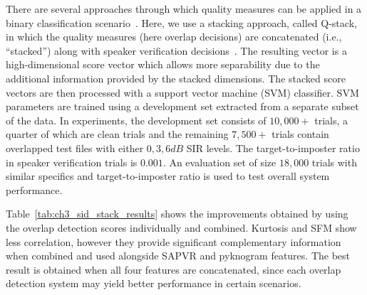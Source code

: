 There are several approaches through which quality measures can be applied in a binary classification scenario~\cite{bosaris,ietqstack,kelly2013}. 
Here, we use a stacking approach, called Q-stack, in which the quality measures (here overlap decisions) are concatenated (i.e., ``stacked'') along with speaker verification decisions~\cite{ietqstack}. 
The resulting vector is a high-dimensional score vector which allows more separability due to the additional information provided by the stacked dimensions. 
The stacked score vectors are then processed with a support vector machine (SVM) classifier. 
SVM parameters are trained using a development set extracted from a separate subset of the data. 
In experiments, the development set consists of $10,000+$ trials, a quarter of which are clean trials and the remaining $7,500+$ trials contain overlapped test files with either $0,3,6dB$ SIR levels. 
The target-to-imposter ratio in speaker verification trials is $0.001$. 
An evaluation set of size $18,000$ trials with similar specifics and target-to-imposter ratio is used to test overall system performance.


Table~\ref{tab:ch3_sid_stack_results} shows the improvements obtained by using the overlap detection scores individually and combined. 
Kurtosis and SFM show less correlation, however they provide significant complementary information when combined and used alongside SAPVR and pyknogram features. 
The best result is obtained when all four features are concatenated, since each overlap detection system may yield better performance in certain scenarios.  


